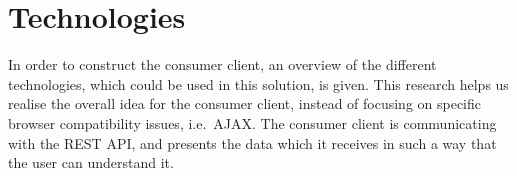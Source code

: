 \section{Technologies} \label{sec:technologies}
In order to construct the consumer client, an overview of the different technologies, which could be used in this solution, is given.
This research helps us realise the overall idea for the consumer client, instead of focusing on specific browser compatibility issues, i.e.~\ac{AJAX}.
The consumer client is communicating with the REST API, and presents the data which it receives in such a way that the user can understand it.
